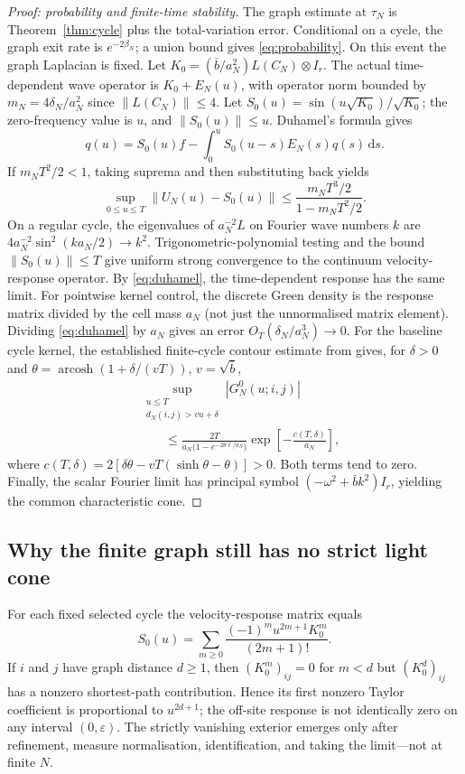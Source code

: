 \documentclass[11pt,a4paper]{article}
\numberwithin{equation}{section}
\newcommand{\barb}{\bar b}
\newcommand{\norm}[1]{\left\lVert#1\right\rVert}
\newcommand{\dd}{\mathrm d}
\newcommand{\1}{\mathbf{1}}
\newcommand{\arcosh}{\operatorname{arcosh}}
\begin{document}
\begin{proof}[Proof: probability and finite-time stability]
The graph estimate at $\tau_N$ is Theorem~\ref{thm:cycle} plus the total-variation error. Conditional on a cycle, the graph exit rate is $e^{-2\beta_N}$; a union bound gives \eqref{eq:probability}. On this event the graph Laplacian is fixed. Let $K_0=(\barb/a_N^2)L(C_N)\otimes I_r$. The actual time-dependent wave operator is $K_0+E_N(u)$, with operator norm bounded by $m_N=4\delta_N/a_N^2$ since $\norm{L(C_N)}\leq4$. Let $S_0(u)=\sin(u\sqrt{K_0})/\sqrt{K_0}$; the zero-frequency value is $u$, and $\norm{S_0(u)}\leq u$. Duhamel's formula gives
\[
 q(u)=S_0(u)f-\int_0^u S_0(u-s)E_N(s)q(s)\,\dd s.
\]
If $m_NT^2/2<1$, taking suprema and then substituting back yields
\begin{equation}\label{eq:duhamel}
 \sup_{0\leq u\leq T}\norm{U_N(u)-S_0(u)}\leq
 \frac{m_NT^3/2}{1-m_NT^2/2}.
\end{equation}
On a regular cycle, the eigenvalues of $a_N^{-2}L$ on Fourier wave numbers $k$ are $4a_N^{-2}\sin^2(ka_N/2)\to k^2$. Trigonometric-polynomial testing and the bound $\norm{S_0(u)}\leq T$ give uniform strong convergence to the continuum velocity-response operator. By \eqref{eq:duhamel}, the time-dependent response has the same limit. For pointwise kernel control, the discrete Green density is the response matrix divided by the cell mass $a_N$ (not just the unnormalised matrix element). Dividing \eqref{eq:duhamel} by $a_N$ gives an error $O_T(\delta_N/a_N^3)\to0$. For the baseline cycle kernel, the established finite-cycle contour estimate from \cite[Part II]{companion} gives, for $\delta>0$ and $\theta=\arcosh(1+\delta/(vT))$, $v=\sqrt{\barb}$,
\begin{equation}\label{eq:exterior}
\begin{aligned}
 &\sup_{\substack{u\leq T\\d_N(i,j)>vu+\delta}}|G_N^0(u;i,j)|\\
 &\qquad\leq\frac{2T}{a_N\bigl(1-e^{-2\theta\ell/a_N}\bigr)}
 \exp\!\left[-\frac{c(T,\delta)}{a_N}\right],
\end{aligned}
\end{equation}
where $c(T,\delta)=2[\delta\theta-vT(\sinh\theta-\theta)]>0$.
Both terms tend to zero. Finally, the scalar Fourier limit has principal symbol $(-\omega^2+\barb k^2)I_r$, yielding the common characteristic cone.
\end{proof}

\subsection{Why the finite graph still has no strict light cone}
For each fixed selected cycle the velocity-response matrix equals
\[
 S_0(u)=\sum_{m\geq0}\frac{(-1)^m u^{2m+1}K_0^m}{(2m+1)!}.
\]
If $i$ and $j$ have graph distance $d\geq1$, then $(K_0^m)_{ij}=0$ for $m<d$ but $(K_0^d)_{ij}$ has a nonzero shortest-path contribution. Hence its first nonzero Taylor coefficient is proportional to $u^{2d+1}$; the off-site response is not identically zero on any interval $(0,\varepsilon)$. The strictly vanishing exterior emerges only after refinement, measure normalisation, identification, and taking the limit---not at finite $N$.
\end{document}
